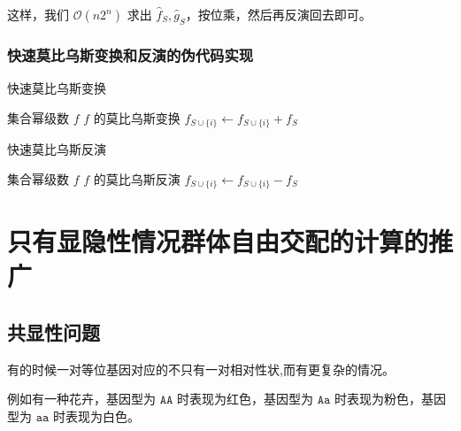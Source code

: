 \documentclass{article}
\begin{document}
这样，我们 $\mathcal{O}(n2^n)$ 求出 $\hat f_S,\hat g_S$，按位乘，然后再反演回去即可。


\subsubsection*{快速莫比乌斯变换和反演的伪代码实现}

\begin{algorithm}
    \caption{快速莫比乌斯变换}
    \begin{algorithmic}[1]
        \Require 集合幂级数 $f$
        \Ensure $f$ 的莫比乌斯变换
                    \State $f_{S \cup \{i\}} \gets f_{S \cup \{i\}} + f_{S}$
                \EndFor
            \EndFor
            \State {}
        \EndFunction
    \end{algorithmic}
\end{algorithm}

\begin{algorithm}
    \caption{快速莫比乌斯反演}
    \begin{algorithmic}[1]
        \Require 集合幂级数 $f$
        \Ensure $f$ 的莫比乌斯反演
                    \State $f_{S \cup \{i\}} \gets f_{S \cup \{i\}} - f_{S}$
                \EndFor
            \EndFor
            \State {}
        \EndFunction
    \end{algorithmic}
\end{algorithm}

\newpage

\section{只有显隐性情况群体自由交配的计算的推广}

\subsection{共显性问题}

有的时候一对等位基因对应的不只有一对相对性状,而有更复杂的情况。

例如有一种花卉，基因型为 $\texttt{AA}$ 时表现为红色，基因型为 $\texttt{Aa}$ 时表现为粉色，基因型为 $\texttt{aa}$ 时表现为白色。
\end{document}
